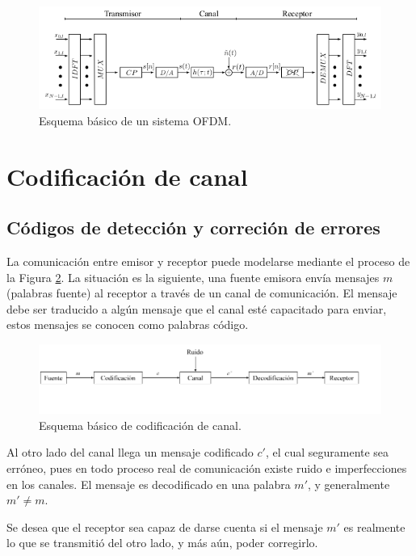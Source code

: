 \begin{figure}[h!]
	\centering
	\includegraphics[scale=0.65]{figuras/cap02/ofdm_system}
	\caption{\label{f:ofdm_system} Esquema básico de un sistema OFDM.}
\end{figure}


\section{Codificación de canal}

	\subsection{C\'odigos de detecci\'on y correci\'on de errores}

La comunicación entre emisor y receptor puede modelarse mediante el proceso de la Figura \ref{diagrama_codificacion}. La situación es la siguiente, una fuente emisora envía mensajes $m$ (palabras fuente) al receptor a través de un canal de comunicación. El mensaje debe ser traducido a algún mensaje que el canal esté capacitado para enviar, estos mensajes se conocen como palabras código.

\begin{figure}[h!]
\centering
\includegraphics[scale=0.45]{figuras/cap02/diagrama_codificacion}
\caption{\label{diagrama_codificacion} Esquema básico de codificación de canal.}
\end{figure}

Al otro lado del canal llega un mensaje codificado $c'$, el cual seguramente sea erróneo, pues en todo proceso real de comunicación existe ruido e imperfecciones en los canales. El mensaje es decodificado en una palabra $m'$, y generalmente $m' \neq m$.

Se desea que el receptor sea capaz de darse cuenta si el mensaje $m'$ es realmente lo que se transmitió del otro lado, y más aún, poder corregirlo. 


